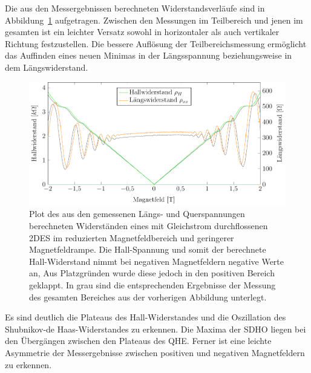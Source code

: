 Die aus den Messergebnissen berechneten Widerstandsverläufe sind in Abbildung~\ref{fig:2T_range_dc} aufgetragen. Zwischen den Messungen im Teilbereich und jenen im gesamten ist ein leichter Versatz sowohl in horizontaler als auch vertikaler Richtung festzustellen. Die bessere Auflösung der Teilbereichsmessung ermöglicht das Auffinden eines neuen Minimas in der Längsspannung beziehungsweise in dem Längswiderstand.\\

\begin{figure}[h]
	\centering
	\includegraphics{graphs/dc/pm2T_range.pdf}
	\caption[Höher aufgelöste Gleichstrommessung in Magnetfeldteilbereich]{
		Plot des aus den gemessenen Längs- und Querspannungen berechneten Widerständen eines mit Gleichstrom durchflossenen 2DES im reduzierten Magnetfeldbereich und geringerer Magnetfeldrampe. Die Hall-Spannung und somit der berechnete Hall-Widerstand nimmt bei negativen Magnetfeldern negative Werte an, Aus Platzgründen wurde diese jedoch in den positiven Bereich geklappt. In grau sind die entsprechenden Ergebnisse der Messung des gesamten Bereiches aus der vorherigen Abbildung unterlegt.
	}
	\label{fig:2T_range_dc}
\end{figure}


Es sind deutlich die Plateaus des Hall-Widerstandes und die Oszillation des Shubnikov-de Haas-Widerstandes zu erkennen. Die Maxima der SDHO liegen bei den Übergängen zwischen den Plateaus des QHE. Ferner ist eine leichte Asymmetrie der Messergebnisse zwischen positiven und negativen Magnetfeldern zu erkennen. 